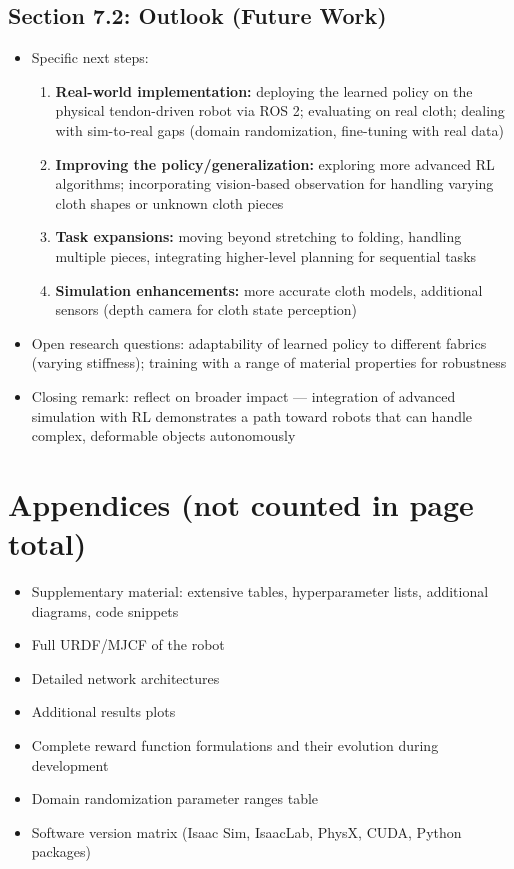 \subsection{Section 7.2: Outlook (Future Work)}
\begin{itemize}
    \item Specific next steps:
    \begin{enumerate}
        \item \textbf{Real-world implementation:} deploying the learned policy on the physical tendon-driven robot via ROS 2; evaluating on real cloth; dealing with sim-to-real gaps (domain randomization, fine-tuning with real data)
        \item \textbf{Improving the policy/generalization:} exploring more advanced RL algorithms; incorporating vision-based observation for handling varying cloth shapes or unknown cloth pieces
        \item \textbf{Task expansions:} moving beyond stretching to folding, handling multiple pieces, integrating higher-level planning for sequential tasks
        \item \textbf{Simulation enhancements:} more accurate cloth models, additional sensors (depth camera for cloth state perception)
    \end{enumerate}
    \item Open research questions: adaptability of learned policy to different fabrics (varying stiffness); training with a range of material properties for robustness
    \item Closing remark: reflect on broader impact --- integration of advanced simulation with RL demonstrates a path toward robots that can handle complex, deformable objects autonomously
\end{itemize}

\section{Appendices (not counted in page total)}

\begin{itemize}
    \item Supplementary material: extensive tables, hyperparameter lists, additional diagrams, code snippets
    \item Full URDF/MJCF of the robot
    \item Detailed network architectures
    \item Additional results plots
    \item Complete reward function formulations and their evolution during development
    \item Domain randomization parameter ranges table
    \item Software version matrix (Isaac Sim, IsaacLab, PhysX, CUDA, Python packages)
\end{itemize}
